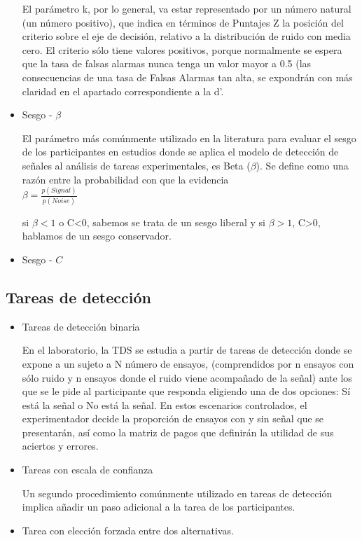 \begin{itemize}
 El parámetro k, por lo general, va estar representado por un número natural (un número positivo), que indica en términos de Puntajes Z  la posición del criterio sobre el eje de decisión, relativo a la distribución de ruido con media cero. El criterio sólo tiene valores positivos, porque normalmente se espera que la tasa de falsas alarmas nunca tenga un valor mayor a 0.5 (las consecuencias de una tasa de Falsas Alarmas tan alta, se expondrán con más claridad en el apartado correspondiente a la d’. \\


\item Sesgo - $\beta$

El parámetro más comúnmente utilizado en la literatura para evaluar el sesgo de los participantes en estudios donde se aplica el modelo de detección de señales al análisis de tareas experimentales, es Beta ($\beta$). Se define como una razón entre la probabilidad con que la evidencia  \\

$\beta = \frac{p(Signal)}{p(Noise)}$

si $\beta<1$ o C<0, sabemos se trata de un sesgo liberal y si $\beta>1$, C>0, hablamos de un sesgo conservador.\\

\item Sesgo - $C$


\end{itemize}   %




\subsection{Tareas de detección}

\begin{itemize}
\item Tareas de detección binaria 

En el laboratorio, la  TDS se estudia a partir  de tareas de detección donde se expone a un  sujeto  a  N  número  de  ensayos,  (comprendidos  por  n  ensayos con  sólo  ruido  y  n  ensayos donde  el  ruido  viene  acompañado  de  la  señal)  ante  los  que  se  le  pide  al  participante  que responda eligiendo una de dos opciones: Sí está la señal o No está la señal. En estos escenarios controlados,  el  experimentador  decide  la  proporción  de  ensayos  con  y  sin  señal  que  se presentarán, así como la matriz de pagos que definirán la utilidad de sus aciertos y errores. \\


\item Tareas con escala de confianza

Un segundo procedimiento comúnmente utilizado en tareas de detección implica añadir un paso adicional a la tarea de los participantes. 


\item Tarea con elección forzada entre dos alternativas.



\end{itemize}

